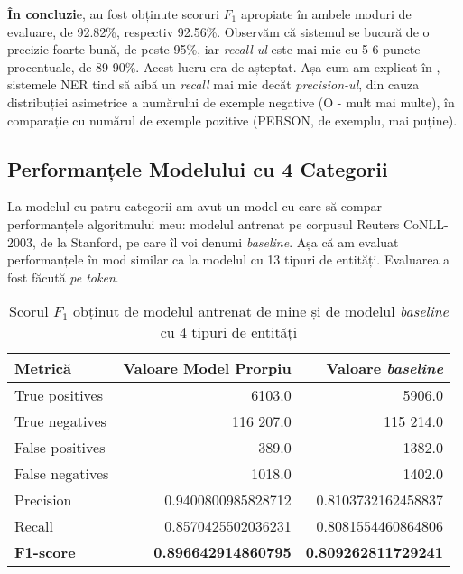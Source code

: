 \textbf{În concluzi}e, au fost obținute scoruri $F_1$ apropiate în ambele moduri de evaluare, de  92.82\%, respectiv 92.56\%. Observăm că sistemul se bucură de o precizie foarte bună, de peste 95\%, iar \textit{recall-ul} este mai mic cu 5-6 puncte procentuale, de 89-90\%. Acest lucru era de așteptat. Așa cum am explicat în , sistemele NER tind să aibă un \textit{recall} mai mic decăt \textit{precision-ul}, din cauza distribuției asimetrice a numărului de exemple negative (O - mult mai multe), în comparație cu numărul de exemple pozitive (PERSON, de exemplu, mai puține). 

\subsection{Performanțele Modelului cu 4 Categorii}

La modelul cu patru categorii am avut un model cu care să compar performanțele algoritmului meu: modelul antrenat pe corpusul Reuters CoNLL-2003, de la Stanford, pe care îl voi denumi \textit{baseline}. Așa că am evaluat performanțele în mod similar ca la modelul cu 13 tipuri de entități. Evaluarea a fost făcută \textit{pe token}.

\begin{center}
\begin{table}[htb]
  \caption{Scorul $F_1$ obținut de modelul antrenat de mine și de modelul \textit{baseline} cu 4 tipuri de entități}
  \begin{tabular}{|l|r|r|}
  \hline
   Metrică & Valoare Model Prorpiu & Valoare \textit{baseline}\\
   \hline
  True positives & 6103.0 & 5906.0 \\
  True negatives & 116 207.0 & 115 214.0\\
  False positives & 389.0 & 1382.0 \\
  False negatives & 1018.0 & 1402.0\\
    \hline
  Precision &  0.9400800985828712 & 0.8103732162458837 \\
  Recall &  0.8570425502036231 & 0.8081554460864806 \\
  \hline
  \textbf{F1-score} & \textbf{0.896642914860795} & \textbf{0.809262811729241}\\
   \hline
   
  \end{tabular}
  \label{table:f1-score-5-class}
\end{table}
\end{center}

